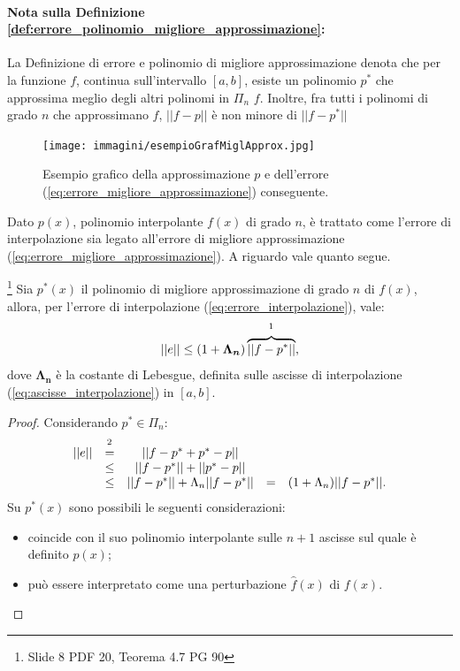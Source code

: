 \paragraph{Nota sulla Definizione \ref{def:errore_polinomio_migliore_approssimazione}:} La Definizione di errore e polinomio di migliore approssimazione denota che per la funzione $f$, continua sull'intervallo $[a,b]$, esiste un polinomio $p^*$ che approssima meglio degli altri polinomi in $\Pi_n$ $f$. Inoltre, fra tutti i polinomi di grado $n$ che approssimano $f$, $||f-p||$ è non minore di $||f-p^*||$

\begin{figure}
    \centering
    \texttt{[image: immagini/esempioGrafMiglApprox.jpg]}
    \caption{Esempio grafico della approssimazione $p$ e dell'errore (\ref{eq:errore_migliore_approssimazione}) conseguente.}\label{fig:esempioGrafMiglApprox}
\end{figure}

Dato $p(x)$, polinomio interpolante $f(x)$ di grado $n$, è trattato come l'errore di interpolazione sia legato all'errore di migliore approssimazione (\ref{eq:errore_migliore_approssimazione}). A riguardo vale quanto segue.

\begin{theorem}\label{th:approssimazione_errore_migliore_approssimazione}\footnote{Slide 8 PDF 20, Teorema 4.7 PG 90}
    Sia $p^*(x)$ il polinomio di migliore approssimazione di grado $n$ di $f(x)$, allora, per l'errore di interpolazione (\ref{eq:errore_interpolazione}), vale:
    \begin{equation}\label{eq:approssimazione_errore_migliore_approssimazione}
        ||e||\leq (1+\boldsymbol{\Lambda_n})\overbrace{||f-p^*||}^{\footnotemark},
    \end{equation}
    dove $\boldsymbol{\Lambda_n}$ è la costante di Lebesgue, definita sulle ascisse di interpolazione (\ref{eq:ascisse_interpolazione}) in $[a, b]$.
\end{theorem}
\begin{proof}
Considerando $p^*\in\Pi_n$:
    \begin{equation*}
        \begin{matrix}
            ||e||&\overset{\footnotemark}{=}&||f-p^*+p^*-p||\\
            &\leq& ||f-p^*||+||p^*-p||\\
            &\leq& ||f-p^*||+\Lambda_n||f-p^*||
            &=&(1+\Lambda_n)||f-p^*||.
        \end{matrix}
    \end{equation*}
    Su $p^*(x)$ sono possibili le seguenti considerazioni:
    \begin{itemize}
        \item coincide con il suo polinomio interpolante sulle $n+1$ ascisse sul quale è definito $p(x)$;
        \item può essere interpretato come una perturbazione $\widehat f(x)$ di $f(x)$.
    \end{itemize}
\end{proof}

